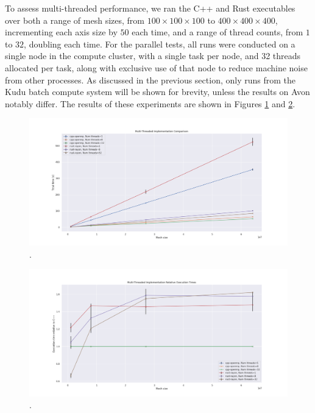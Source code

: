 To assess multi-threaded performance, we ran the C++ and Rust executables over both a range of mesh sizes, from $100 \times 100 \times 100$ to $400 \times 400 \times 400$, incrementing each axis size by $50$ each time, and a range of thread counts, from $1$ to $32$, doubling each time. For the parallel tests, all runs were conducted on a single node in the compute cluster, with a single task per node, and 32 threads allocated per task, along with exclusive use of that node to reduce machine noise from other processes. As discussed in the previous section, only runs from the Kudu batch compute system will be shown for brevity, unless the results on Avon notably differ. The results of these experiments are shown in Figures \ref{fig:5_parallel_line_all} and \ref{fig:7_parallel_line_relative}.

\begin{figure}[H]
    \centering
    \includegraphics[width=\textwidth]{images/5_performance/parallelism/5_parallel_line_all.png}
    \caption{.}
    \label{fig:5_parallel_line_all}
\end{figure}

\begin{figure}[H]
    \centering
    \includegraphics[width=\textwidth]{images/5_performance/parallelism/7_parallel_line_relative.png}
    \caption{.}
    \label{fig:7_parallel_line_relative}
\end{figure}

